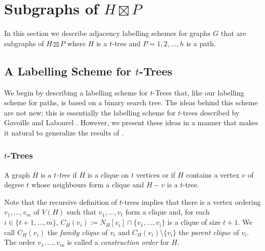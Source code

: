 \documentclass[kpfonts]{patmorin}
\begin{document}
\section{Subgraphs of $H\boxtimes P$}

In this section we describe adjacency labelling schemes for graphs $G$ that are subgraphs of $H\boxtimes P$ where $H$ is a $t$-tree and $P=1,2,\ldots,h$ is a path.  


\subsection{A Labelling Scheme for $t$-Trees}

We begin by describing a labelling scheme for $t$-Trees that, like our labelling scheme for paths, is based on a binary search tree.  The ideas behind this scheme are not new; this is essentially the labelling scheme for $t$-trees described by Gavoille and Labourel \cite{gavoille.labourel:shorter}.  However, we present these ideas in a manner that makes it natural to generalize the results of .

\subsubsection{$t$-Trees}

A graph $H$ is a \emph{$t$-tree} if $H$ is a clique on $t$ vertices or if $H$ contains a vertex $v$ of degree $t$ whose neighbours form a clique and $H-v$ is a $t$-tree.  

Note that the recursive definition of $t$-trees implies that there is a vertex ordering $v_1,\ldots,v_{m}$ of $V(H)$ such that $v_1,\ldots,v_t$ form a clique and, for each $i\in\{t+1,\ldots,m\}$, $C_H(v_i):=N_H[v_i]\cap \{v_1,\ldots,v_{i}\}$ is a clique of size $t+1$.  We call $C_H(v_i)$ the \emph{family clique} of $v_i$ and $C_H(v_i)\setminus\{v_i\}$ the \emph{parent clique} of $v_i$.  The order $v_1,\ldots,v_m$ is called a \emph{construction order} for $H$.
\end{document}
